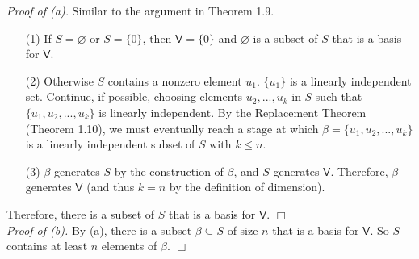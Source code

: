 \documentclass{article}
\begin{document}
\emph{Proof of (a).}
Similar to the argument in Theorem 1.9.
\begin{enumerate}
\item[(1)]
If $S = \varnothing$ or $S = \{0\}$, then $\mathsf{V} = \{0\}$
and $\varnothing$ is a subset of $S$ that is a basis for $\mathsf{V}$.
\item[(2)]
Otherwise $S$ contains a nonzero element $u_1$.
$\{u_1\}$ is a linearly independent set.
Continue, if possible, choosing elements $u_2, ..., u_k$ in $S$ such that
$\{u_1, u_2, ..., u_k\}$ is linearly independent.
By the Replacement Theorem (Theorem 1.10),
we must eventually reach a stage at which
$\beta = \{u_1, u_2, ..., u_k\}$ is a linearly independent subset of $S$
with $k \leq n$.
\item[(3)]
$\beta$ generates $S$ by the construction of $\beta$,
and $S$ generates $\mathsf{V}$.
Therefore, $\beta$ generates $\mathsf{V}$
(and thus $k = n$ by the definition of dimension).
\end{enumerate}
Therefore,
there is a subset of $S$ that is a basis for $\mathsf{V}$.
$\Box$ \\

\emph{Proof of (b).}
By (a), there is a subset $\beta \subseteq S$ of size $n$
that is a basis for $\mathsf{V}$.
So $S$ contains at least $n$ elements of $\beta$.
$\Box$ \\\\
\end{document}
